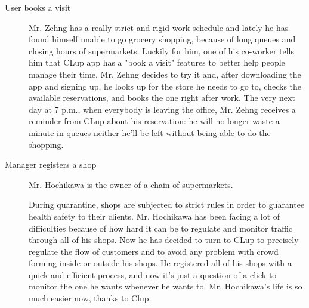 \begin{description}
    \item[User books a visit]
    Mr. Zehng  has a really strict and rigid work schedule and lately he has found himself unable to go grocery shopping, because of long queues and closing hours of supermarkets. Luckily for him, one of his co-worker tells him that CLup app has a "book a visit" features to better help people manage their time. Mr. Zehng decides to try it and, after downloading the app and signing up, he looks up for the store he needs to go to, checks the available reservations, and books the one right after work. The very next day at 7 p.m., when everybody is leaving the office, Mr. Zehng receives a reminder from CLup about his reservation: he will no longer waste a minute in queues neither he'll be left without being able to do the shopping.

    \item[Manager registers a shop]
    Mr. Hochikawa is the owner of a chain of supermarkets.
    
    During quarantine, shops are subjected to strict rules in order to guarantee health safety to their clients. Mr. Hochikawa has been facing a lot of difficulties because of how hard it can be to regulate and monitor traffic through all of his shops. Now he has decided to turn to CLup to precisely regulate the flow of customers and to avoid any problem with crowd forming inside or outside his shops. He registered all of his shops with a quick and efficient process, and now it’s just a question of a click to monitor the one he wants whenever he wants to. Mr. Hochikawa’s life is so much easier now, thanks to Clup.



\end{description}
